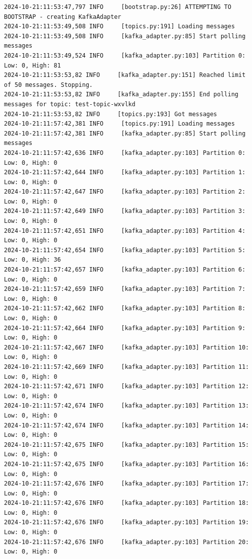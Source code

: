 \documentclass[10pt , a4paper]{report}
\newenvironment{code}{\captionsetup{type=listing}}{}
\begin{document}
\begin{code}
  \begin{verbatim}  
2024-10-21:11:53:47,797 INFO     [bootstrap.py:26] ATTEMPTING TO BOOTSTRAP - creating KafkaAdapter
2024-10-21:11:53:49,508 INFO     [topics.py:191] Loading messages
2024-10-21:11:53:49,508 INFO     [kafka_adapter.py:85] Start polling messages
2024-10-21:11:53:49,524 INFO     [kafka_adapter.py:103] Partition 0: Low: 0, High: 81
2024-10-21:11:53:53,82 INFO     [kafka_adapter.py:151] Reached limit of 50 messages. Stopping.
2024-10-21:11:53:53,82 INFO     [kafka_adapter.py:155] End polling messages for topic: test-topic-wxvlkd
2024-10-21:11:53:53,82 INFO     [topics.py:193] Got messages
2024-10-21:11:57:42,381 INFO     [topics.py:191] Loading messages
2024-10-21:11:57:42,381 INFO     [kafka_adapter.py:85] Start polling messages
2024-10-21:11:57:42,636 INFO     [kafka_adapter.py:103] Partition 0: Low: 0, High: 0
2024-10-21:11:57:42,644 INFO     [kafka_adapter.py:103] Partition 1: Low: 0, High: 0
2024-10-21:11:57:42,647 INFO     [kafka_adapter.py:103] Partition 2: Low: 0, High: 0
2024-10-21:11:57:42,649 INFO     [kafka_adapter.py:103] Partition 3: Low: 0, High: 0
2024-10-21:11:57:42,651 INFO     [kafka_adapter.py:103] Partition 4: Low: 0, High: 0
2024-10-21:11:57:42,654 INFO     [kafka_adapter.py:103] Partition 5: Low: 0, High: 36
2024-10-21:11:57:42,657 INFO     [kafka_adapter.py:103] Partition 6: Low: 0, High: 0
2024-10-21:11:57:42,659 INFO     [kafka_adapter.py:103] Partition 7: Low: 0, High: 0
2024-10-21:11:57:42,662 INFO     [kafka_adapter.py:103] Partition 8: Low: 0, High: 0
2024-10-21:11:57:42,664 INFO     [kafka_adapter.py:103] Partition 9: Low: 0, High: 0
2024-10-21:11:57:42,667 INFO     [kafka_adapter.py:103] Partition 10: Low: 0, High: 0
2024-10-21:11:57:42,669 INFO     [kafka_adapter.py:103] Partition 11: Low: 0, High: 0
2024-10-21:11:57:42,671 INFO     [kafka_adapter.py:103] Partition 12: Low: 0, High: 0
2024-10-21:11:57:42,674 INFO     [kafka_adapter.py:103] Partition 13: Low: 0, High: 0
2024-10-21:11:57:42,674 INFO     [kafka_adapter.py:103] Partition 14: Low: 0, High: 0
2024-10-21:11:57:42,675 INFO     [kafka_adapter.py:103] Partition 15: Low: 0, High: 0
2024-10-21:11:57:42,675 INFO     [kafka_adapter.py:103] Partition 16: Low: 0, High: 0
2024-10-21:11:57:42,676 INFO     [kafka_adapter.py:103] Partition 17: Low: 0, High: 0
2024-10-21:11:57:42,676 INFO     [kafka_adapter.py:103] Partition 18: Low: 0, High: 0
2024-10-21:11:57:42,676 INFO     [kafka_adapter.py:103] Partition 19: Low: 0, High: 0
2024-10-21:11:57:42,676 INFO     [kafka_adapter.py:103] Partition 20: Low: 0, High: 0

\end{verbatim}
\end{code}
\end{document}
